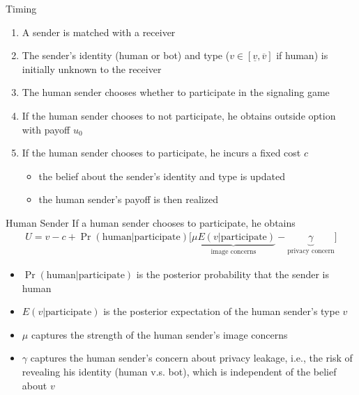 \documentclass[11pt,aspectratio=169]{beamer}
\DeclareMathOperator{\prob}{Pr}
\begin{document}
\begin{frame}{Timing}

\begin{enumerate}\setlength{\itemsep}{1em}
    \item A sender is matched with a receiver
    \item The sender's identity (human or bot) and type ($v\in [\underline{v},\overline{v}]$ if human) is initially unknown to the receiver
    \item The human sender chooses whether to participate in the signaling game
    \item If the human sender chooses to not participate, he obtains outside option with payoff $u_0$
    \item If the human sender chooses to participate, he incurs a fixed cost $c$
    \begin{itemize}
        \item the belief about the sender's identity and type is updated
        \item the human sender's payoff is then realized
    \end{itemize}
\end{enumerate}
    
\end{frame}


\begin{frame}{Human Sender}
If a human sender chooses to participate, he obtains
\begin{align*}
    U = v - c + \prob(\text{human}|\text{participate})\Big[\underbrace{\mu E(v|\text{participate})}_{\text{image concerns}} - \underbrace{\gamma}_{{\text{privacy concern}}}\Big]
\end{align*}
\vspace{1em}

\begin{itemize}
    \item $\prob(\text{human}|\text{participate})$ is the posterior probability that the sender is human
    \item $E(v|\text{participate})$ is the posterior expectation of the human sender's type $v$ 
    \item $\mu$ captures the strength of the human sender's image concerns
    \item $\gamma$ captures the human sender's concern about privacy leakage, i.e., the risk of revealing his identity (human v.s. bot), which is independent of the belief about $v$
\end{itemize}
\end{frame}
\end{document}
